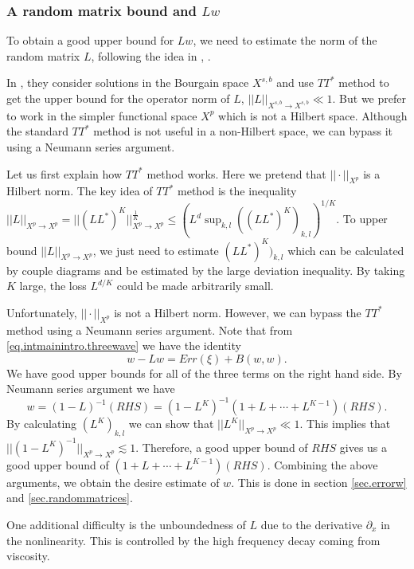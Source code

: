 \subsubsection{A random matrix bound and $Lw$}\label{sec.randmatintro} To obtain a good upper bound for $Lw$, we need to estimate the norm of the random matrix $L$, following the idea in \cite{deng2021derivation}, \cite{deng2021full}.

In \cite{deng2021derivation}, they consider solutions in the Bourgain space $X^{s,b}$ and use $TT^*$ method to get the upper bound for the operator norm of $L$, $||L||_{X^{s,b}\rightarrow X^{s,b}}\ll 1$. But we prefer to work in the simpler functional space $X^p$ which is not a Hilbert space. Although the standard $TT^*$ method is not useful in a non-Hilbert space, we can bypass it using a Neumann series argument.

Let us first explain how $TT^*$ method works. Here we pretend that $||\cdot||_{X^p}$ is a Hilbert norm. The key idea of $TT^*$ method is the inequality $||L||_{X^p\rightarrow X^p}=||(LL^*)^K||_{X^p\rightarrow X^p}^{\frac{1}{K}}\le (L^d\sup_{k,l} ((LL^*)^K)_{k,l})^{1/K}$. To upper bound $||L||_{X^p\rightarrow X^p}$, we just need to estimate $(LL^*)^K)_{k,l}$ which can be calculated by couple diagrams and be estimated by the large deviation inequality. By taking $K$ large, the loss $L^{d/K}$ could be made arbitrarily small.

Unfortunately, $||\cdot||_{X^p}$ is not a Hilbert norm. However, we can bypass the $TT^*$ method using a Neumann series argument. Note that from \eqref{eq.intmainintro.threewave} we have the identity
\begin{equation}
    w-Lw= Err(\xi)+B(w,w).
\end{equation}
We have good upper bounds for all of the three terms on the right hand side. By Neumann series argument we have
\begin{equation}
    w= (1-L)^{-1}(\textit{RHS}) =(1-L^K)^{-1}(1+L+\cdots+L^{K-1})(\textit{RHS}).
\end{equation}
By calculating $(L^K)_{k,l}$ we can show that $||L^K||_{X^p\rightarrow X^p}\ll 1$. This implies that $||(1-L^K)^{-1}||_{X^p\rightarrow X^p}\lesssim 1$. Therefore, a good upper bound of $\textit{RHS}$ gives us a good upper bound of $(1+L+\cdots+L^{K-1})(\textit{RHS})$. Combining the above arguments, we obtain the desire estimate of $w$. This is done in section \ref{sec.errorw} and \ref{sec.randommatrices}.

One additional difficulty is the unboundedness of $L$ due to the derivative $\partial_x$ in the nonlinearity. This is controlled by the high frequency decay coming from viscosity.

